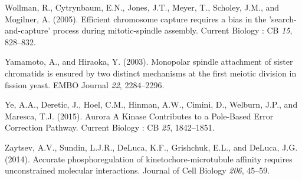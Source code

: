 \documentclass[12pt,a4paper,twoside,openright]{book}
\begin{document}
Wollman, R., Cytrynbaum, E.N., Jones, J.T., Meyer, T., Scholey, J.M.,
and Mogilner, A. (2005). Efficient chromosome capture requires a bias in
the 'search-and-capture' process during mitotic-spindle assembly.
Current Biology : CB \emph{15}, 828--832.

Yamamoto, A., and Hiraoka, Y. (2003). Monopolar spindle attachment of
sister chromatids is ensured by two distinct mechanisms at the first
meiotic division in fission yeast. EMBO Journal \emph{22}, 2284--2296.

Ye, A.A., Deretic, J., Hoel, C.M., Hinman, A.W., Cimini, D., Welburn,
J.P., and Maresca, T.J. (2015). Aurora A Kinase Contributes to a
Pole-Based Error Correction Pathway. Current Biology : CB \emph{25},
1842--1851.

Zaytsev, A.V., Sundin, L.J.R., DeLuca, K.F., Grishchuk, E.L., and
DeLuca, J.G. (2014). Accurate phosphoregulation of
kinetochore-microtubule affinity requires unconstrained molecular
interactions. Journal of Cell Biology \emph{206}, 45--59.
\end{document}
